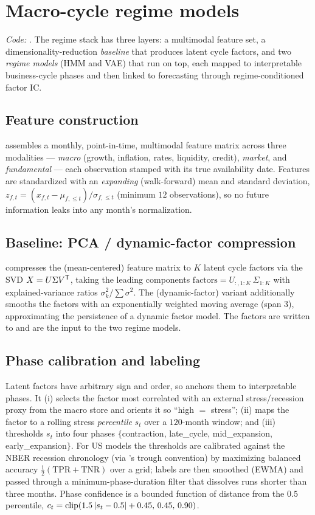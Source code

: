 \documentclass[11pt]{article}
\begin{document}
\section{Macro-cycle regime models}
\label{sec:regime}
\emph{Code:} . The regime stack has three layers: a
multimodal feature set, a dimensionality-reduction \emph{baseline} that produces
latent cycle factors, and two \emph{regime models} (HMM and VAE) that run on top,
each mapped to interpretable business-cycle phases and then linked to forecasting
through regime-conditioned factor IC.

\subsection{Feature construction}
 assembles a monthly, point-in-time, multimodal feature
matrix across three modalities --- \emph{macro} (growth, inflation, rates,
liquidity, credit), \emph{market}, and \emph{fundamental} --- each observation
stamped with its true availability date. Features are standardized with an
\emph{expanding} (walk-forward) mean and standard deviation,
$z_{f,t}=(x_{f,t}-\mu_{f,\le t})/\sigma_{f,\le t}$ (minimum $12$ observations), so
no future information leaks into any month's normalization.

\subsection{Baseline: PCA / dynamic-factor compression}
 compresses the (mean-centered) feature matrix to $K$
latent cycle factors via the SVD $X=U\Sigma V^{\mathsf{T}}$, taking the leading components
$\text{factors}=U_{:,1:K}\,\Sigma_{1:K}$ with explained-variance ratios
$\sigma_k^2/\sum\sigma^2$. The  (dynamic-factor) variant additionally
smooths the factors with an exponentially weighted moving average (span $3$),
approximating the persistence of a dynamic factor model. The factors are written
to  and are the input to the two
regime models.

\subsection{Phase calibration and labeling}
\label{sec:phasecal}
Latent factors have arbitrary sign and order, so  anchors
them to interpretable phases. It (i) selects the factor most correlated with an
external stress/recession proxy from the macro store and orients it so ``high $=$
stress''; (ii) maps the factor to a rolling stress \emph{percentile} $s_t$ over a
$120$-month window; and (iii) thresholds $s_t$ into four phases
$\{$contraction, late\_cycle, mid\_expansion, early\_expansion$\}$. For US models
the thresholds are calibrated against the NBER recession chronology (via
's trough convention) by maximizing balanced accuracy
$\tfrac12(\mathrm{TPR}+\mathrm{TNR})$ over a grid; labels are then smoothed
(EWMA) and passed through a minimum-phase-duration filter that dissolves runs
shorter than three months. Phase confidence is a bounded function of distance from
the $0.5$ percentile,
$c_t=\operatorname{clip}(1.5\,|s_t-0.5|+0.45,\,0.45,\,0.90)$.
\end{document}
